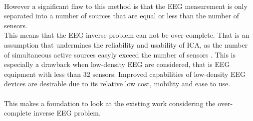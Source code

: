 \\
However a significant flaw to this method is that the EEG measurement is only separated into a number of sources that are equal or less than the number of sensors.
\\
This means that the EEG inverse problem can not be over-complete. That is an assumption that undermines the reliability and usability of ICA, as the number of simultaneous active sources easyly  exceed the number of sensors \cite{phd2015}. This is especially a drawback when low-density EEG are considered, that is EEG equipment with less than 32 sensors. Improved capabilities of low-density EEG devices are desirable due to its relative low cost, mobility and ease to use. 
\\  
\\
This makes a foundation to look at the existing work considering the over-complete inverse EEG problem. 


